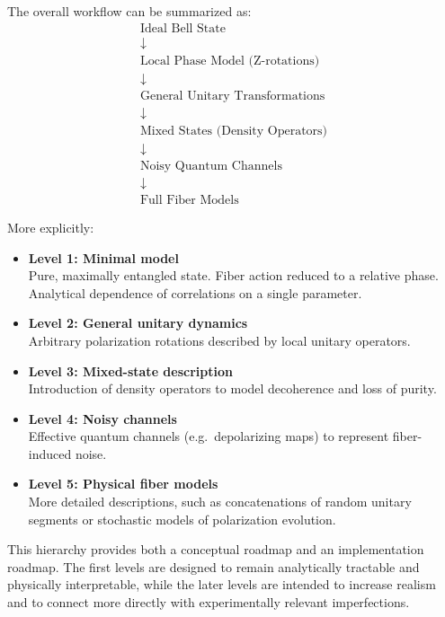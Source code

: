 \documentclass[a4paper]{article}
\begin{document}
The overall workflow can be summarized as:
\[
\begin{array}{c}
\text{Ideal Bell State} \\
\downarrow \\
\text{Local Phase Model (Z-rotations)} \\
\downarrow \\
\text{General Unitary Transformations} \\
\downarrow \\
\text{Mixed States (Density Operators)} \\
\downarrow \\
\text{Noisy Quantum Channels} \\
\downarrow \\
\text{Full Fiber Models}
\end{array}
\]

More explicitly:

\begin{itemize}
    \item \textbf{Level 1: Minimal model} \\
    Pure, maximally entangled state. Fiber action reduced to a relative phase. Analytical dependence of correlations on a single parameter.

    \item \textbf{Level 2: General unitary dynamics} \\
    Arbitrary polarization rotations described by local unitary operators.

    \item \textbf{Level 3: Mixed-state description} \\
    Introduction of density operators to model decoherence and loss of purity.

    \item \textbf{Level 4: Noisy channels} \\
    Effective quantum channels (e.g.\ depolarizing maps) to represent fiber-induced noise.

    \item \textbf{Level 5: Physical fiber models} \\
    More detailed descriptions, such as concatenations of random unitary segments or stochastic models of polarization evolution.
\end{itemize}

This hierarchy provides both a conceptual roadmap and an implementation roadmap. The first levels are designed to remain analytically tractable and physically interpretable, while the later levels are intended to increase realism and to connect more directly with experimentally relevant imperfections.
\end{document}
